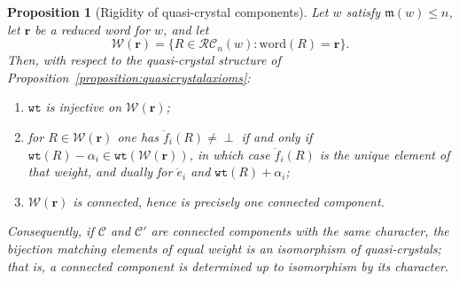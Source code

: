 \documentclass{amsart}
\newtheorem{proposition}[lemma]{Proposition}
\theoremstyle{definition}
\theoremstyle{remark}
\numberwithin{equation}{subsection}
\newcommand{\wtt}{\mathtt{wt}}
\newcommand{\RC}{\mathcal{RC}}
\newcommand{\maxd}{\mathfrak{m}}
\begin{document}
\begin{proposition}[Rigidity of quasi-crystal components]\label{proposition:quasirigid}
Let $w$ satisfy $\maxd(w)\leq n$, let $\mathbf{r}$ be a reduced word for $w$, and let
$$\mathcal{W}(\mathbf{r})=\{R\in\RC_n(w):\mathrm{word}(R)=\mathbf{r}\}.$$
Then, with respect to the quasi-crystal structure of Proposition~\ref{proposition:quasicrystalaxioms}:
\begin{enumerate}
\item $\wtt$ is injective on $\mathcal{W}(\mathbf{r})$;
\item for $R\in\mathcal{W}(\mathbf{r})$ one has $\ddot{f}_i(R)\neq\perp$ if and only if $\wtt(R)-\alpha_i\in\wtt(\mathcal{W}(\mathbf{r}))$, in which case $\ddot{f}_i(R)$ is the unique element of that weight, and dually for $\ddot{e}_i$ and $\wtt(R)+\alpha_i$;
\item $\mathcal{W}(\mathbf{r})$ is connected, hence is precisely one connected component.
\end{enumerate}
Consequently, if $\mathcal{C}$ and $\mathcal{C}'$ are connected components with the same character, the bijection matching elements of equal weight is an isomorphism of quasi-crystals; that is, a connected component is determined up to isomorphism by its character.
\end{proposition}
\end{document}
